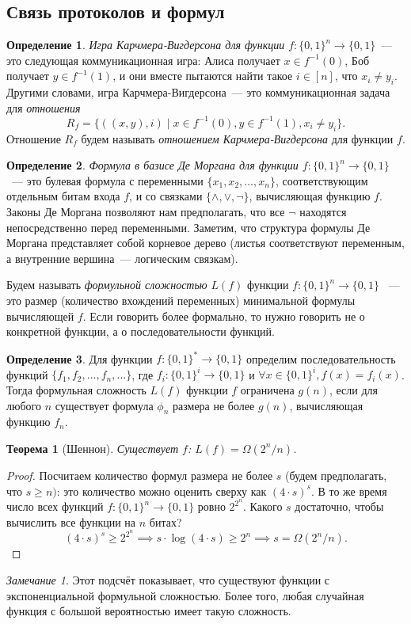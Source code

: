 \documentclass[12pt]{article}
\newcommand{\bits}{\{0,1\}}
\newcommand{\bitstr}{\bits^*}
\newcommand{\seqn}[2]{{#1}_1,{#1}_2,\dotsc,{#1}_{#2}}
\theoremstyle{definition}
\newtheorem{definition}{Определение}[section]
\theoremstyle{plain}
\newtheorem{theorem}{Теорема}[section]
\theoremstyle{remark}
\newtheorem{remark}{Замечание}[section]
\begin{document}
\subsection{Связь протоколов и формул}
\begin{definition}  
    \emph{Игра Карчмера-Вигдерсона для функции $f : \{0,1\}^n \to \{0,1\}$}~--- это 
    следующая коммуникационная игра: Алиса получает $x\in f^{-1}(0)$, Боб получает 
    $y\in f^{-1}(1)$, и они вместе пытаются найти такое $i\in [n]$, что $x_i \neq y_i$. 
    Другими словами, игра Карчмера-Вигдерсона~--- это коммуникационная задача для 
    \emph{отношения} $$R_f = \{((x,y),i)\mid x\in f^{-1}(0), y\in f^{-1}(1), x_i\neq y_i\}.$$
    Отношение $R_f$ будем называть \emph{отношением Карчмера-Вигдерсона} для функции $f$.
\end{definition}

\begin{definition}
    \emph{Формула в базисе Де Моргана для функции $f:\{0,1\}^n \to \{0,1\}$}~--- это булевая 
    формула с переменными $\{\seqn{x}{n}\}$, соответствующим отдельным битам входа $f$,
    и со связками $\{\land, \lor, \neg\}$, вычисляющая функцию $f$.
    Законы Де Моргана позволяют нам предполагать, что все $\neg$ находятся непосредственно
    перед переменными. Заметим, что структура формулы Де Моргана представляет собой корневое дерево
    (листья соответствуют переменным, а внутренние вершина~--- логическим связкам).
\end{definition}

Будем называть \emph{формульной сложностью} $L(f)$ функции $f : \{0,1\}^n \to \{0,1\}$ ~---
это размер (количество вхождений переменных) минимальной формулы вычисляющей $f$. Если
говорить более формально, то нужно говорить не о конкретной функции, а о последовательности
функций.

\begin{definition}
    Для функции $f:\bitstr\to\{0,1\}$ определим последовательность функций $\{\seqn{f}{n},\dotsc\}$,
    где $f_i: \{0,1\}^i\to\{0,1\}$ и $\forall x\in\{0,1\}^i, f(x) = f_i(x)$. Тогда формульная сложность
    $L(f)$ функции $f$ ограничена $g(n)$, если для любого $n$ существует формула $\phi_n$ размера
    не более $g(n)$, вычисляющая функцию $f_n$.
\end{definition}

\begin{theorem}[Шеннон]
    Существует $f$: $L(f) = \Omega(2^n/n)$.
\end{theorem}
\begin{proof}
    Посчитаем количество формул размера не более $s$ (будем предполагать, что $s\ge n)$: 
    это количество можно оценить сверху как $(4\cdot s)^s$. В то же время число всех функций 
    $f: \{0,1\}^n \to \{0,1\}$ ровно $2^{2^n}$. Какого $s$ достаточно,
    чтобы вычислить все функции на $n$ битах?
    $$(4\cdot s)^s \ge 2^{2^n} \implies s\cdot \log(4\cdot s) \ge 2^n \implies s = \Omega(2^n/n).$$
\end{proof}
\begin{remark}
    Этот подсчёт показывает, что существуют функции с экспоненциальной формульной сложностью.
    Более того, любая случайная функция с большой вероятностью имеет такую сложность.
\end{remark}
\end{document}
